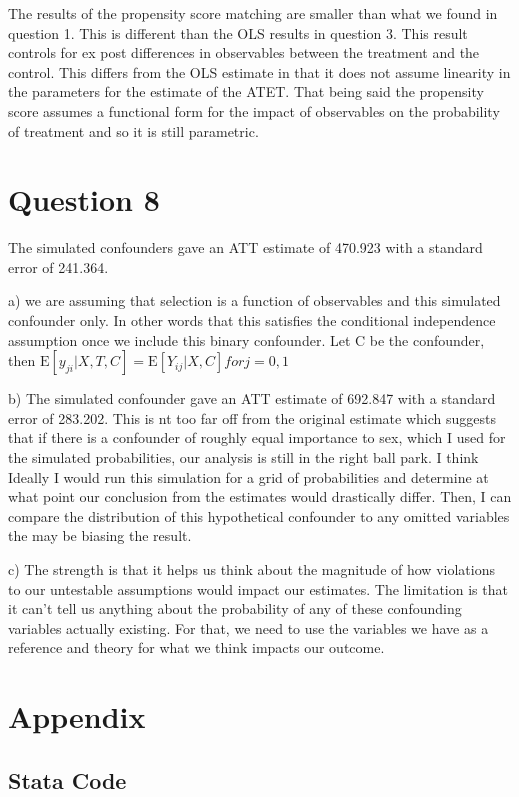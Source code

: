 \documentclass[11pt]{article}
\newcommand{\E}{\mathrm{E}}
\begin{document}
The results of the propensity score matching are smaller than what we found in question 1. This is different than the OLS results in question 3. This result controls for ex post differences in observables between the treatment and the control. This differs from the OLS estimate in that it does not assume linearity in the parameters for the estimate of the ATET. That being said the propensity score assumes a functional form for the impact of observables on the probability of treatment and so it is still parametric.  



\section{ Question 8}

The simulated confounders gave an ATT estimate of 470.923 with a standard error of 241.364.

a) we are assuming that selection is a function of observables and this simulated confounder only. In other words that this satisfies the conditional independence assumption once we include this binary confounder. Let C be the confounder, then 
$ \E[y_{ji} | X, T, C] = \E[Y_{ij}|X,C] for j = 0,1$

b) The simulated confounder gave an ATT estimate of 692.847  with a standard error of 283.202. This is nt too far off from the original estimate which suggests that if there is a confounder of roughly equal importance to sex, which I used for the simulated probabilities,  our analysis is still in the right ball park. I think Ideally I would run this simulation for a grid of probabilities and determine at what point our conclusion from the estimates would drastically differ. Then, I can compare the distribution of this hypothetical confounder to any omitted variables the may be biasing the result. 


c) The strength is that it helps us think about the magnitude of how violations to our untestable assumptions would impact our estimates. The limitation is that it can't tell us anything about the probability of any of these confounding variables actually existing. For that, we need to use the variables we have as a reference and theory for what we think impacts our outcome. 


\section{Appendix}
\subsection{Stata Code}





\end{document}
